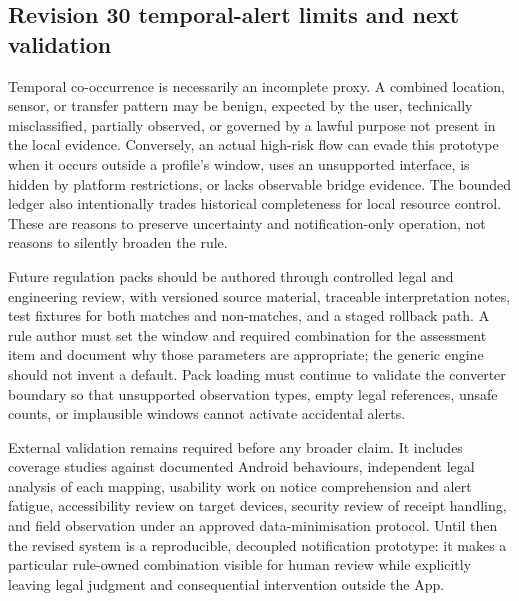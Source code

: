 

\subsection{Revision 30 temporal-alert limits and next validation}

Temporal co-occurrence is necessarily an incomplete proxy. A combined location, sensor, or transfer pattern may be benign, expected by the user, technically misclassified, partially observed, or governed by a lawful purpose not present in the local evidence. Conversely, an actual high-risk flow can evade this prototype when it occurs outside a profile's window, uses an unsupported interface, is hidden by platform restrictions, or lacks observable bridge evidence. The bounded ledger also intentionally trades historical completeness for local resource control. These are reasons to preserve uncertainty and notification-only operation, not reasons to silently broaden the rule.

Future regulation packs should be authored through controlled legal and engineering review, with versioned source material, traceable interpretation notes, test fixtures for both matches and non-matches, and a staged rollback path. A rule author must set the window and required combination for the assessment item and document why those parameters are appropriate; the generic engine should not invent a default. Pack loading must continue to validate the converter boundary so that unsupported observation types, empty legal references, unsafe counts, or implausible windows cannot activate accidental alerts.

External validation remains required before any broader claim. It includes coverage studies against documented Android behaviours, independent legal analysis of each mapping, usability work on notice comprehension and alert fatigue, accessibility review on target devices, security review of receipt handling, and field observation under an approved data-minimisation protocol. Until then the revised system is a reproducible, decoupled notification prototype: it makes a particular rule-owned combination visible for human review while explicitly leaving legal judgment and consequential intervention outside the App.
